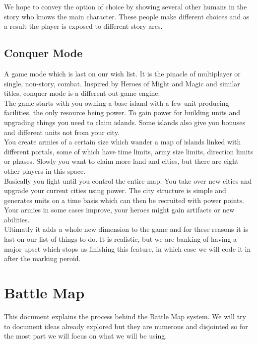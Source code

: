 \documentclass[a4paper,twocolumn]{article}
\begin{document}
We hope to convey the option of choice by showing several other humans in the story who knows the main character. These people make different choices and as a result the player is exposed to different story arcs.\\

\subsection{Conquer Mode}

A game mode which is last on our wish list. It is the pinacle of multiplayer or single, non-story, combat. Inspired by Heroes of Might and Magic and similar titles, conquer mode is a different out-game engine.\\

The game starts with you owning a base island with a few unit-producing facilities, the only resource being power. To gain power for building units and upgrading things you need to claim islands. Some islands also give you bonuses and different units not from your city.\\

You create armies of a certain size which wander a map of islands linked with different portals, some of which have time limits, army size limits, direction limits or phases. Slowly you want to claim more land and cities, but there are eight other players in this space.\\

Basically you fight until you control the entire map. You take over new cities and upgrade your current cities using power. The city structure is simple and generates units on a time basis which can then be recruited with power points. Your armies in some cases improve, your heroes might gain artifacts or new abilities.\\

Ultimatly it adds a whole new dimension to the game and for these reasons it is last on our list of things to do. It is realistic, but we are banking of having a major upset which stops us finishing this feature, in which case we will code it in after the marking peroid.


\newpage \section{Battle Map}

This document explains the process behind the Battle Map system. We will try to document ideas already explored but they are numerous and disjointed so for the most part we will focus on what we will be using.
\end{document}

